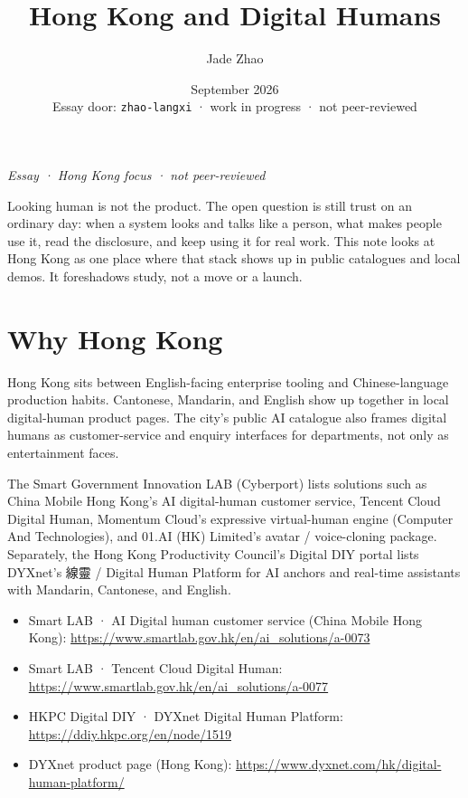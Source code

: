 \documentclass[11pt,a4paper]{article}
\title{Hong Kong and Digital Humans}
\author{Jade Zhao}
\date{September 2026 \\ \small Essay door: \texttt{zhao-langxi} · work in progress · not peer-reviewed}
\begin{document}
\maketitle

\noindent\textit{Essay · Hong Kong focus · not peer-reviewed}

Looking human is not the product. The open question is still trust on an ordinary day: when a system looks and talks like a person, what makes people use it, read the disclosure, and keep using it for real work.
This note looks at Hong Kong as one place where that stack shows up in public catalogues and local demos. It foreshadows study, not a move or a launch.

\section*{Why Hong Kong}

Hong Kong sits between English-facing enterprise tooling and Chinese-language production habits.
Cantonese, Mandarin, and English show up together in local digital-human product pages.
The city's public AI catalogue also frames digital humans as customer-service and enquiry interfaces for departments, not only as entertainment faces.

The Smart Government Innovation LAB (Cyberport) lists solutions such as China Mobile Hong Kong's AI digital-human customer service, Tencent Cloud Digital Human, Momentum Cloud's expressive virtual-human engine (Computer And Technologies), and 01.AI (HK) Limited's avatar / voice-cloning package.
Separately, the Hong Kong Productivity Council's Digital DIY portal lists DYXnet's 線靈 / Digital Human Platform for AI anchors and real-time assistants with Mandarin, Cantonese, and English.

\begin{itemize}
  \item Smart LAB · AI Digital human customer service (China Mobile Hong Kong):
    \url{https://www.smartlab.gov.hk/en/ai_solutions/a-0073}
  \item Smart LAB · Tencent Cloud Digital Human:
    \url{https://www.smartlab.gov.hk/en/ai_solutions/a-0077}
  \item HKPC Digital DIY · DYXnet Digital Human Platform:
    \url{https://ddiy.hkpc.org/en/node/1519}
  \item DYXnet product page (Hong Kong):
    \url{https://www.dyxnet.com/hk/digital-human-platform/}
\end{itemize}
\end{document}
